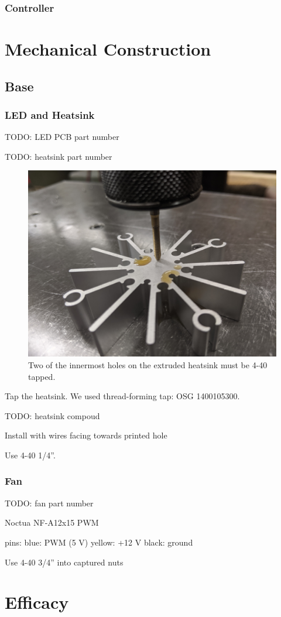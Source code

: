 \documentclass[11pt]{article}
\let\stdsection\section
\renewcommand\section{\clearpage\stdsection}
\begin{document}


\subsubsection{Controller}

\section{Mechanical Construction}

\subsection{Base}

\subsubsection{LED and Heatsink}

TODO: LED PCB part number

TODO: heatsink part number

\begin{figure}
  \centering
  \includegraphics[width=\textwidth/2]{"../pictures/tap-heatsink.jpg"}
  \caption{Two of the innermost holes on the extruded heatsink must be 4-40 tapped.}
\end{figure}

Tap the heatsink.
We used thread-forming tap: OSG 1400105300.

TODO: heatsink compoud

Install with wires facing towards printed hole

Use 4-40 1/4''.

\subsubsection{Fan}

TODO: fan part number

Noctua NF-A12x15 PWM

pins:
blue: PWM (5 V)
yellow: +12 V
black: ground

Use 4-40 3/4'' into captured nuts

\section{Efficacy}
\end{document}
